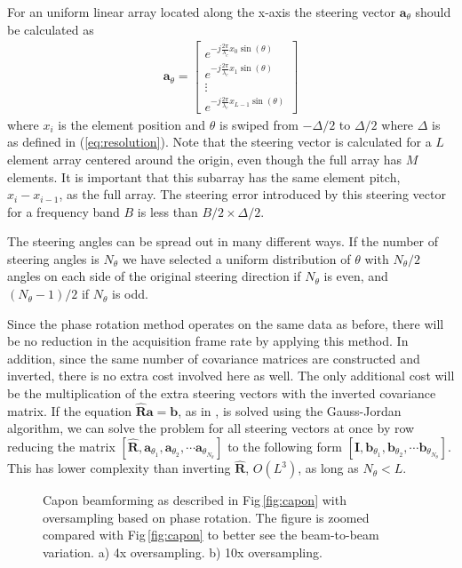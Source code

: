 \documentclass[journal]{IEEEtran}
\newcommand{\mat}[1]{\mathbf{#1}}
\renewcommand{\vec}[1]{\mathbf{#1}}
\newcommand{\img}{img/}
\begin{document}
For an uniform linear array located along the x-axis the steering vector $\vec{a}_\theta$ should be calculated as 
\begin{align}
\vec{a}_\theta = 
\begin{bmatrix}
e^{-j\frac{2\pi}{\lambda_c}x_0\sin(\theta)} \\
e^{-j\frac{2\pi}{\lambda_c}x_1\sin(\theta)} \\
\vdots \\ 
e^{-j\frac{2\pi}{\lambda_c}x_{L-1}\sin(\theta)}
\end{bmatrix}
\end{align}
where $x_i$ is the element position and $\theta$ is swiped from $-\Delta/2$ to $\Delta/2$ where $\Delta$ is as defined in (\ref{eq:resolution}). Note that the steering vector is calculated for a $L$ element array centered around the origin, even though the full array has $M$ elements. It is important that this subarray has the same element pitch, $x_i - x_{i-1}$, as the full array. The steering error introduced by this steering vector for a frequency band $B$ is less than $B/2 \times \Delta/2$.

The steering angles can be spread out in many different ways. If the number of steering angles is $N_\theta$ we have selected a uniform distribution of $\theta$  with $N_\theta/2$ angles on each side of the original steering direction if $N_\theta$ is even, and $(N_\theta-1)/2$ if $N_\theta$ is odd. 

Since the phase rotation method operates on the same data as before, there will be no reduction in the acquisition frame rate by applying this method. In addition, since the same number of covariance matrices are constructed and inverted, there is no extra cost involved here as well. The only additional cost will be the multiplication of the extra steering vectors with the inverted covariance matrix. If the equation $\mat{\hat{R}}\vec{a} = \vec{b}$, as in \cite{Asen}, is solved using the Gauss-Jordan algorithm, we can solve the problem for all steering vectors at once by row reducing the matrix $[\mat{\hat{R}},  \vec{a}_{\theta_1}, \vec{a}_{\theta_2}, \cdots \vec{a}_{\theta_{N_\theta}}]$ to the following form $[\mat{I},  \vec{b}_{\theta_1}, \vec{b}_{\theta_2}, \cdots \vec{b}_{\theta_{N_\theta}}]$. This has lower complexity than inverting $\mat{\hat{R}}$, $O(L^3)$, as long as $N_\theta < L$.

\begin{figure}[!t]
	\centerline{
	}
	\caption{Capon beamforming as described in Fig\,\ref{fig:capon} with oversampling based on phase rotation. The figure is zoomed compared with Fig\,\ref{fig:capon} to better see the beam-to-beam variation. a) 4x oversampling. b) 10x oversampling.}
	\label{fig:benchmark_capon_bs}
\end{figure}
\end{document}
